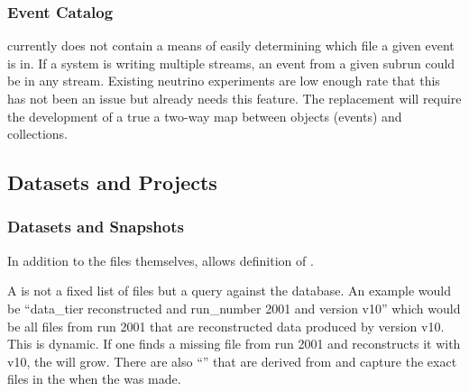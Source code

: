 \documentclass[../main-v1.tex]{subfiles}
\begin{document}
\subsubsection{Event Catalog}
 currently does not contain a means of easily determining which file a given event is in.  If a  system is writing multiple streams, an event from a given subrun could be in any stream.   Existing neutrino experiments are low enough rate that this has not been an issue but  already needs this feature.
The  replacement will require the development of a true a two-way map between objects (events) and collections. 

 


\subsection{Datasets and Projects}

\subsubsection{Datasets and Snapshots}

In addition to the files themselves,  allows %
definition of .


A   is not a fixed list of files but a query against the  database. An example would be ``data\_tier reconstructed and run\_number 2001 and version v10'' which would be all files from run 2001 that are reconstructed data produced by version v10. This  is dynamic. If one finds a missing file from run 2001 
and reconstructs it with v10, the  will grow. There are also  ``'' that are derived from  and capture the exact files in the  when the  was made.
\end{document}
